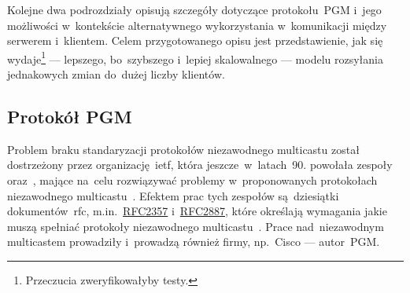 \documentclass[thesis]{subfiles}
\begin{document}
Kolejne dwa podrozdziały opisują szczegóły dotyczące protokołu~PGM i~jego możliwości w~kontekście alternatywnego wykorzystania w~komunikacji między serwerem i~klientem. Celem przygotowanego opisu jest przedstawienie, jak się wydaje\footnote{Przeczucia zweryfikowałyby testy.} --- lepszego, bo~szybszego i~lepiej skalowalnego --- modelu rozsyłania jednakowych zmian do~dużej liczby klientów.


\subsection{Protokół PGM}
\label{subsec:pgm}

Problem braku standaryzacji protokołów niezawodnego multicastu został dostrzeżony przez organizację~\gls{ietf}, która jeszcze~w~latach~90. powołała zespoły  oraz~, mające na~celu rozwiązywać problemy w~proponowanych protokołach niezawodnego multicastu~\cite{reliable-multicast-journal,reliable-multicast-transport}. Efektem prac tych zespołów są~dziesiątki dokumentów~\gls{rfc}, m.in.~\href{https://tools.ietf.org/html/rfc2357.html}{RFC2357} i~\href{https://tools.ietf.org/html/rfc2887}{RFC2887}, które określają wymagania jakie muszą spełniać protokoły niezawodnego multicastu~\cite{rfc2887,rfc2357}. Prace nad~niezawodnym multicastem prowadziły i~prowadzą również firmy, np.~Cisco --- autor~PGM.
\end{document}
